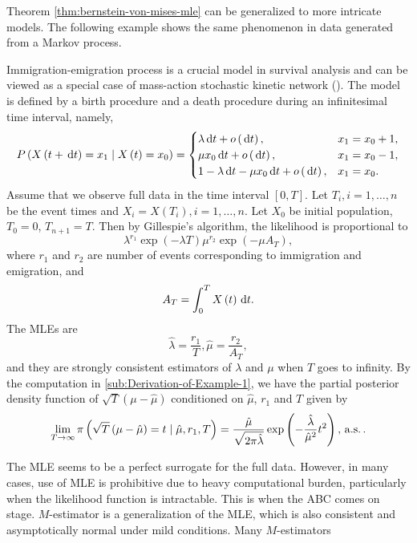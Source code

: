 Theorem \ref{thm:bernstein-von-mises-mle} can be generalized to more
intricate models. The following example shows the same phenomenon
in data generated from a Markov process.
\begin{example}
\label{exa:Immigrate-emigrate-process}Immigration-emigration process
is {a } crucial
model in survival analysis and can be viewed as a special case of
mass-action stochastic kinetic  {network
} (\citet{wilkinson2011stochastic}). The model is defined by a birth
procedure and {a } death
procedure during an infinitesimal time interval, namely, 
\[
P\left(X\left(t+\,\mathrm{d} t\right)=x_{1}\mid X\left(t\right)=x_{0}\right)=\begin{cases}
\lambda\,\mathrm{d} t+o\left(\,\mathrm{d} t\right), & x_{1}=x_{0}+1,\\
\mu x_{0}\,\mathrm{d} t+o\left(\,\mathrm{d} t\right), & x_{1}=x_{0}-1,\\
1-\lambda\,\mathrm{d} t-\mu x_{0}\,\mathrm{d} t+o\left(\,\mathrm{d} t\right), & x_{1}=x_{0}.
\end{cases}
\]
Assume that we observe full data in the time interval $\left[0,T\right]$.
Let $T_{i},i=1,\ldots,n$ be the event times and $X_{i}=X\left(T_{i}\right),i=1,\ldots,n$.
Let $X_{0}$ be initial population, $T_{0}=0$, $T_{n+1}=T$. Then
by Gillespie's algorithm, the likelihood is proportional to 
\[
\lambda^{r_{1}}\exp\left(-\lambda T\right)\mu^{r_{2}}\exp\left(-\mu A_{T}\right),
\]
where $r_{1}$ and $r_{2}$ are number of events corresponding to
immigration and emigration, and 
\[
A_{T}=\int_{0}^{T}X\left(t\right)\,\mathrm{d} t.
\]
The MLEs are 
\[
\hat{\lambda}=\frac{r_{1}}{T},\hat{\mu}=\frac{r_{2}}{A_{T}},
\]
and they are strongly consistent estimators of $\lambda$ {and $\mu$} when $T$ goes to
infinity. By the computation in  \ref{sub:Derivation-of-Example-1},
we have the partial posterior density function of $\sqrt{T}\left(\mu-\hat{\mu}\right)$
conditioned on $\hat{\mu}$, $r_{1}$ and $T$ given by 
\[
\lim_{T\rightarrow\infty}\pi\left(\sqrt{T}\left(\mu-\hat{\mu}\right)=t\mid\hat{\mu},r_{1},T\right)=\frac{\hat{\mu}}{\sqrt{2\pi\hat{\lambda}}}\exp\left(-\frac{\hat{\lambda}}{\hat{\mu}^{2}}t^{2}\right),\,\mathrm{a.s.}\,.
\]

\end{example}
The MLE seems to be a perfect surrogate for  {the
} full data. However, in many cases, use of MLE is
prohibitive due to heavy computational burden, particularly when the
likelihood function is intractable. This is when the ABC comes on
stage. $M$-estimator is a generalization of the MLE, which is also
consistent and asymptotically normal under mild conditions. Many $M$-estimators
